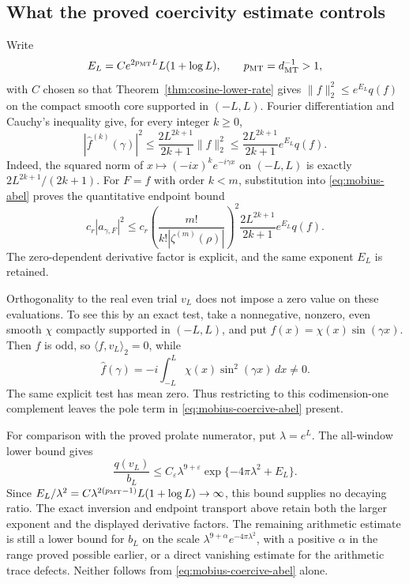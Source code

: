 \subsection{What the proved coercivity estimate controls}

Write
\[
 E_L=C e^{2p_{\rm MT}L}L(1+\log L),
 \qquad p_{\rm MT}=d_{\rm MT}^{-1}>1,
\]
with \(C\) chosen so that Theorem~\ref{thm:cosine-lower-rate}
gives \(\|f\|_2^2\le e^{E_L}q(f)\) on the compact smooth
core supported in \((-L,L)\). Fourier differentiation and
Cauchy's inequality give, for every integer \(k\ge0\),
\begin{equation}\label{eq:mobius-jet-bound}
 |\widehat f^{(k)}(\gamma)|^2
 \le \frac{2L^{2k+1}}{2k+1}\|f\|_2^2
 \le \frac{2L^{2k+1}}{2k+1}e^{E_L}q(f).
\end{equation}
Indeed, the squared norm of \(x\mapsto(-ix)^ke^{-i\gamma x}\)
on \((-L,L)\) is exactly \(2L^{2k+1}/(2k+1)\).
For \(F=\widehat f\) with order \(k<m\), substitution into
\eqref{eq:mobius-abel} proves the quantitative endpoint bound
\begin{equation}\label{eq:mobius-coercive-abel}
 c_r|a_{\gamma,F}|^2
 \le c_r
 \left(\frac{m!}{k!|\zeta^{(m)}(\rho)|}\right)^2
 \frac{2L^{2k+1}}{2k+1}e^{E_L}q(f).
\end{equation}
The zero-dependent derivative factor is explicit, and the same
exponent \(E_L\) is retained.

Orthogonality to the real even trial \(v_L\) does not impose a
zero value on these evaluations. To see this by an exact test,
take a nonnegative, nonzero, even smooth \(\chi\) compactly
supported in \((-L,L)\), and put \(f(x)=\chi(x)\sin(\gamma x)\).
Then \(f\) is odd, so \(\langle f,v_L\rangle_2=0\), while
\[
 \widehat f(\gamma)
 =-i\int_{-L}^L\chi(x)\sin^2(\gamma x)\,dx\ne0.
\]
The same explicit test has mean zero. Thus restricting to this
codimension-one complement leaves the pole term in
\eqref{eq:mobius-coercive-abel} present.

For comparison with the proved prolate numerator, put
\(\lambda=e^L\). The all-window lower bound gives
\[
 \frac{q(v_L)}{b_L}
 \le C_\varepsilon\lambda^{9+\varepsilon}
       \exp\{-4\pi\lambda^2+E_L\}.
\]
Since \(E_L/\lambda^2
 =C\lambda^{2(p_{\rm MT}-1)}L(1+\log L)\to\infty\),
this bound supplies no decaying ratio. The exact inversion and
endpoint transport above retain both the larger exponent and the
displayed derivative factors. The remaining arithmetic estimate
is still a lower bound for \(b_L\) on the scale
\(\lambda^{9+\alpha}e^{-4\pi\lambda^2}\), with a positive
\(\alpha\) in the range proved possible earlier, or a direct
vanishing estimate for the arithmetic trace defects. Neither follows
from \eqref{eq:mobius-coercive-abel} alone.
